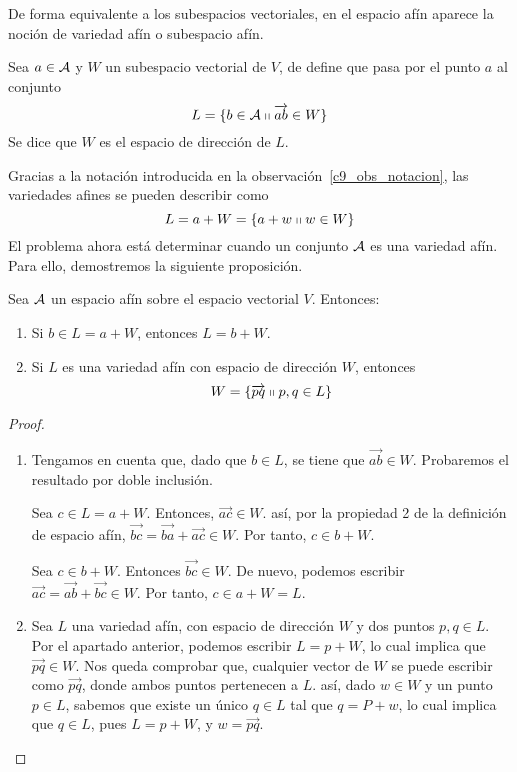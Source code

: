 De forma equivalente a los subespacios vectoriales, en el espacio afín aparece la noción de variedad afín o subespacio afín.
\begin{defi}
	Sea $a\in\mathcal{A}$ y $W$ un subespacio vectorial de $V$, de define  que pasa por el punto $a$ al conjunto
	\begin{equation*}
		L=\{b\in\mathcal{A}\shortparallel \overrightarrow{ab}\in W\}
	\end{equation*}
	Se dice que $W$ es el espacio de dirección de $L$.
\end{defi}
Gracias a la notación introducida en la observación~\ref{c9_obs_notacion}, las variedades afines se pueden describir como
\begin{equation*}
	L=a+W=\{a+w\shortparallel w\in W\}
\end{equation*}
El problema ahora está determinar cuando un conjunto $\mathcal{A}$ es una variedad afín. Para ello, demostremos la siguiente proposición.
\begin{prop}
	Sea $\mathcal{A}$ un espacio afín sobre el espacio vectorial $V$. Entonces:
	\begin{enumerate}
		\item Si $b\in L=a+W$, entonces $L=b+W$.
		\item Si $L$ es una variedad afín con espacio de dirección $W$, entonces
		\begin{equation}
		W=\{\overrightarrow{pq}\shortparallel p,q\in L\}
		\end{equation}
	\end{enumerate}
\end{prop}
\begin{proof}
	\begin{enumerate}
		\item Tengamos en cuenta que, dado que $b\in L$, se tiene que $\overrightarrow{ab}\in W$. Probaremos el resultado por doble inclusión.
		
		Sea $c\in L=a+W$. Entonces, $\overrightarrow{ac}\in W$. así, por la propiedad 2 de la definición de espacio afín, $\overrightarrow{bc}=\overrightarrow{ba}+\overrightarrow{ac}\in W$. Por tanto, $c\in b+W$.
		
		Sea $c\in b+W$. Entonces $\overrightarrow{bc}\in W$. De nuevo, podemos escribir $\overrightarrow{ac}=\overrightarrow{ab}+\overrightarrow{bc}\in W$. Por tanto, $c\in a+W=L$.
		
		\item Sea $L$ una variedad afín, con espacio de dirección $W$ y dos puntos $p,q\in L$. Por el apartado anterior, podemos escribir $L=p+W$, lo cual implica que $\overrightarrow{pq}\in W$. Nos queda comprobar que, cualquier vector de $W$ se puede escribir como $\overrightarrow{pq}$, donde ambos puntos pertenecen a $L$. así, dado $w\in W$ y un punto $p\in L$, sabemos que existe un único $q\in L$ tal que $q=P+w$, lo cual implica que $q\in L$, pues $L=p+W$, y $w=\overrightarrow{pq}$.
	\end{enumerate}
\end{proof}
